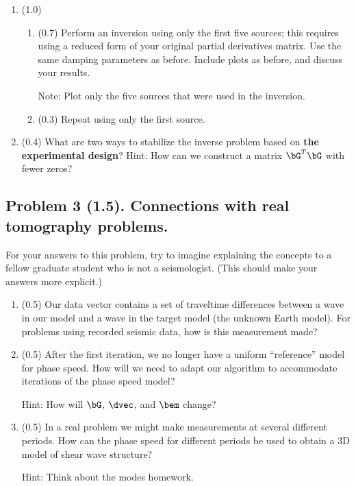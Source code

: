 \documentclass[11pt,titlepage,fleqn]{article}
\begin{document}
\begin{enumerate}
\begin{itemize}
\end{itemize}

\item (1.0) \ptag\
%
\begin{enumerate}
\item (0.7) Perform an inversion using only the first five sources; this requires using a reduced form of your original partial derivatives matrix. Use the same damping parameters as before. Include plots as before, and discuss your results.

Note: Plot only the five sources that were used in the inversion.

\item (0.3) Repeat using only the first source.
\end{enumerate}

\item (0.4) What are two ways to stabilize the inverse problem based on {\bf the experimental design}? Hint: How can we construct a matrix $\bG^T\bG$ with fewer zeros?

\end{enumerate}


\pagebreak
\subsection*{Problem 3 (1.5). Connections with real tomography problems.}

For your answers to this problem, try to imagine explaining the concepts to a fellow graduate student who is not a seismologist. (This should make your answers more explicit.)

\begin{enumerate}
\item (0.5) Our data vector contains a set of traveltime differences between a wave in our model and a wave in the target model (\ie the unknown Earth model). For problems using recorded seismic data, how is this measurement made?

\item (0.5) After the first iteration, we no longer have a uniform ``reference'' model for phase speed. How will we need to adapt our algorithm to accommodate iterations of the phase speed model?

Hint: How will $\bG$, $\dvec$, and $\bem$ change?

\item (0.5) In a real problem we might make measurements at several different periods. How can the phase speed for different periods be used to obtain a 3D model of shear wave structure?

Hint: Think about the modes homework.

\end{enumerate}
\end{document}

